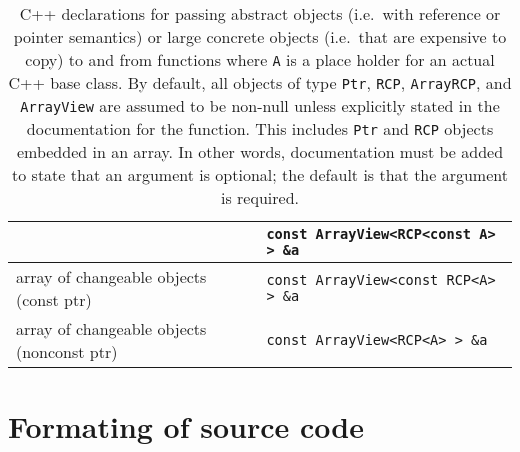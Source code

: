 \begin{table}[p]
\begin{center}
\begin{tabular}{|l|l|}
& {}\texttt{const ArrayView<RCP<const A> > \&a} \\
\hline
array of changeable objects (const ptr)
& {}\texttt{const ArrayView<const RCP<A> > \&a} \\
\hline
array of changeable objects (nonconst ptr)
& {}\texttt{const ArrayView<RCP<A> > \&a} \\
\hline
\end{tabular}
%
\end{center}
\caption{\label{fig:func_args_ref_type}
C++ declarations for passing abstract objects (i.e.\ with reference or pointer
semantics) or large concrete objects (i.e.\ that are expensive to copy) to and
from functions where {}\texttt{A} is a place holder for an actual C++ base
class.  By default, all objects of type {}\texttt{Ptr}, {}\texttt{RCP},
{}\texttt{ArrayRCP}, and {}\texttt{ArrayView} are assumed to be non-null
unless explicitly stated in the documentation for the function. This includes
{}\texttt{Ptr} and {}\texttt{RCP} objects embedded in an array.  In other
words, documentation must be added to state that an argument is optional; the
default is that the argument is required.}
\end{table}


%
\section{Formating of source code}
\label{thyracodingguidelines:formatting:sec}
%

